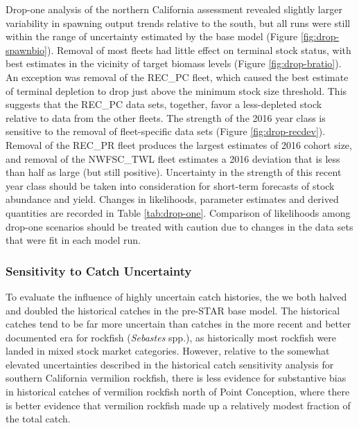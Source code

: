 \documentclass[11pt,
  english,
]{article}
\begin{document}
Drop-one analysis of the northern California assessment revealed slightly larger variability in spawning output trends relative to the south, but all runs were still within the range of uncertainty estimated by the base model (Figure \ref{fig:drop-spawnbio}). Removal of most fleets had little effect on terminal stock status, with best estimates in the vicinity of target biomass levels (Figure \ref{fig:drop-bratio}). An exception was removal of the REC\_PC fleet, which caused the best estimate of terminal depletion to drop just above the minimum stock size threshold. This suggests that the REC\_PC data sets, together, favor a less-depleted stock relative to data from the other fleets. The strength of the 2016 year class is sensitive to the removal of fleet-specific data sets (Figure \ref{fig:drop-recdev}). Removal of the REC\_PR fleet produces the largest estimates of 2016 cohort size, and removal of the NWFSC\_TWL fleet estimates a 2016 deviation that is less than half as large (but still positive). Uncertainty in the strength of this recent year class should be taken into consideration for short-term forecasts of stock abundance and yield. Changes in likelihoods, parameter estimates and derived quantities are recorded in Table \ref{tab:drop-one}. Comparison of likelihoods among drop-one scenarios should be treated with caution due to changes in the data sets that were fit in each model run.


\hypertarget{sensitivity-to-catch-uncertainty}{%
\subsubsection{Sensitivity to Catch Uncertainty}\label{sensitivity-to-catch-uncertainty}}

\leavevmode\tagmcend\tagstructend

To evaluate the influence of highly uncertain catch histories, the we both halved and doubled the historical catches in the pre-STAR base model. The historical catches tend to be far more uncertain than catches in the more recent and better documented era for rockfish (\emph{Sebastes} spp.), as historically most rockfish were landed in mixed stock market categories. However, relative to the somewhat elevated uncertainties described in the historical catch sensitivity analysis for southern California vermilion rockfish, there is less evidence for substantive bias in historical catches of vermilion rockfish north of Point Conception, where there is better evidence that vermilion rockfish made up a relatively modest fraction of the total catch.
\end{document}

